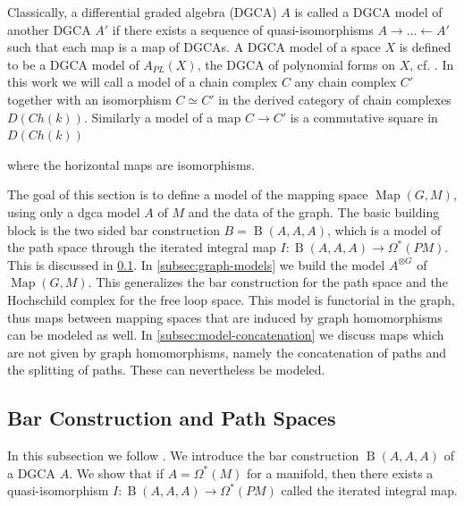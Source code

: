 \documentclass{scrartcl}
\theoremstyle{plain}
\theoremstyle{definition}
\newcommand{\APL}{A_{PL}}
\newcommand{\quiso}{\simeq}
\newcommand{\from}{\leftarrow}
\DeclareMathOperator{\Map}{Map}
\DeclareMathOperator{\BC}{B}
\begin{document}
Classically, a differential graded algebra (DGCA) $A$ is called a DGCA model of another DGCA $A'$ if there exists a sequence of quasi-isomorphisms $A\to\dots\from A'$ such that each map is a map of DGCAs. A DGCA model of a space $X$ is defined to be a DGCA model of $\APL(X)$, the DGCA of polynomial forms on $X$, cf. \cite[ch. 10]{felix2012rational}. In this work we will call a model of a chain complex $C$ any chain complex $C'$ together with an isomorphism $C\quiso C'$ in the derived category of chain complexes $D(Ch(k))$. Similarly a model of a map $C\to C'$ is a commutative square in $D(Ch(k))$
\begin{center}
\end{center}
where the horizontal maps are isomorphisms. 

The goal of this section is to define a model of the mapping space $\Map(G, M)$, using only a dgca model $A$ of $M$ and the data of the graph. The basic building block is the two sided bar construction $B=\BC(A, A, A)$, which is a model of the path space through the iterated integral map $I\colon \BC(A, A, A)\to\Omega^*(PM)$. This is discussed in \cref{subsec:model-path-space}. In \cref{subsec:graph-models} we build the model $A^{\otimes G}$ of $\Map(G, M)$. This generalizes the bar construction for the path space and the Hochschild complex for the free loop space. This model is functorial in the graph, thus maps between mapping spaces that are induced by graph homomorphisms can be modeled as well. In \cref{subsec:model-concatenation} we discuss maps which are not given by graph homomorphisms, namely the concatenation of paths and the splitting of paths. These can nevertheless be modeled. 


\subsection{Bar Construction and Path Spaces}\label{subsec:model-path-space}

In this subsection we follow \cite{naef2019string}. We introduce the bar construction $\BC(A, A, A)$ of a DGCA $A$. We show that if $A=\Omega^*(M)$ for a manifold, then there exists a quasi-isomorphism $I\colon \BC(A, A, A)\to \Omega^*(PM)$ called the iterated integral map. %
\end{document}
